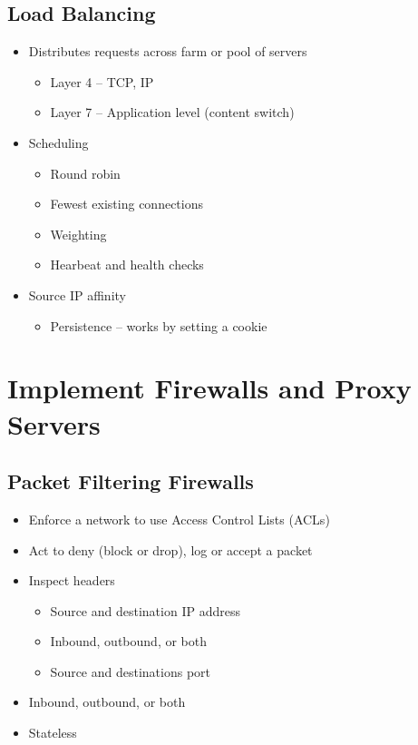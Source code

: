 	\subsection {Load Balancing}
		\begin{itemize}
			\item Distributes requests across farm or pool of servers
				\begin{itemize}
					\item Layer 4 -- TCP, IP
					\item Layer 7 -- Application level (content switch)
				\end{itemize}
			\item Scheduling
				\begin{itemize}
					\item Round robin
					\item Fewest existing connections
					\item Weighting
					\item Hearbeat and health checks
				\end{itemize}
			\item Source IP affinity
				\begin{itemize}
					\item Persistence -- works by setting a cookie
				\end{itemize}
		\end{itemize}

\section {Implement Firewalls and Proxy Servers}
	\subsection {Packet Filtering Firewalls}
		\begin{itemize}
			\item Enforce a network to use Access Control Lists (ACLs)
			\item Act to deny (block or drop), log or accept a packet
			\item Inspect headers
				\begin{itemize}
					\item Source and destination IP address
					\item Inbound, outbound, or both
					\item Source and destinations port
				\end{itemize}
			\item Inbound, outbound, or both
			\item Stateless
		\end{itemize}

